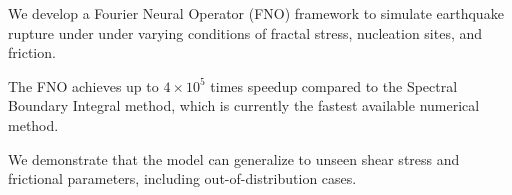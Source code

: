 \documentclass[draft]{agujournal2019}
\begin{document}





\begin{keypoints}
\item We develop a Fourier Neural Operator (FNO) framework to simulate earthquake rupture under under varying conditions of fractal stress, nucleation sites, and friction.
\item The FNO achieves up to \(4 \times 10^5\) times speedup compared to the Spectral Boundary Integral method, which is currently the fastest available numerical method.
\item We demonstrate that the model can generalize to unseen shear stress and frictional parameters, including out-of-distribution cases.
\end{keypoints}

%
%

%
%
\end{document}
